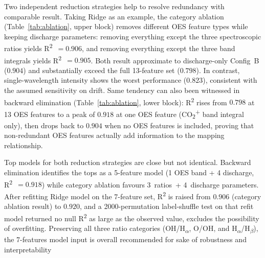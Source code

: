 \documentclass[12pt, a4paper]{article}
\begin{document}
Two independent reduction strategies help to resolve redundancy with comparable result. Taking Ridge as an example, the category ablation (Table~\ref{tab:ablation}, upper block) removes different OES feature types while keeping discharge parameters: removing everything except the three spectroscopic ratios yields R\textsuperscript{2}~$=0.906$, and removing everything except the three band integrals yields R\textsuperscript{2}~$=0.905$. Both result approximate to discharge-only Config~B ($0.904$) and substantially exceed the full 13-feature set ($0.798$). In contrast, single-wavelength intensity shows the worst performance ($0.823$), consistent with the assumed sensitivity on drift. Same tendency can also been witnessed in backward elimination (Table~\ref{tab:ablation}, lower block): R\textsuperscript{2} rises from $0.798$ at 13 OES features to a peak of $0.918$ at one OES feature (CO\textsubscript{2}\textsuperscript{+} band integral only), then drops back to $0.904$ when no OES features is included, proving that non-redundant OES features actually add information to the mapping relationship.

Top models for both reduction strategies are close but not identical. Backward elimination identifies the tops as a 5-feature model (1 OES band + 4 discharge, R\textsuperscript{2}~$=0.918$) while category ablation favours 3~ratios~+ 4~discharge parameters. After refitting Ridge model on the 7-feature set, R\textsuperscript{2} is raised from $0.906$ (category ablation result) to $\mathbf{0.920}$, and a 2000-permutation label-shuffle test on that refit model returned no null R\textsuperscript{2} as large as the observed value, excludes the possibility of overfitting. Preserving all three ratio categories (OH/H\textsubscript{$\alpha$}, O/OH, and H\textsubscript{$\alpha$}/H\textsubscript{$\beta$}), the 7-features model input is overall recommended for sake of robustness and interpretability
\end{document}
